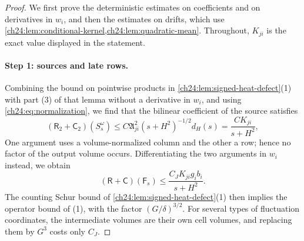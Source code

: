 \begin{proof}
We first prove the deterministic estimates on coefficients and on derivatives in $w_i$, and then the estimates on drifts, which use \cref{ch24:lem:conditional-kernel,ch24:lem:quadratic-mean}. Throughout, $K_{ji}$ is the exact value displayed in the statement.

\paragraph{Step 1: sources and late rows.}
Combining the bound on pointwise products in \cref{ch24:lem:signed-heat-defect}(1) with part (3) of that lemma without a derivative in $w_i$, and using \eqref{ch24:eq:normalization}, we find that the bilinear coefficient of the source satisfies
\begin{equation}\label{ch24:eq:source-coefficients}
 (\mathsf R_2+\mathsf C_2)(S_s^\omega)\le C\mathfrak A_{ji}^2(s+H^2)^{-1/2}d_H(s)=\frac{CK_{ji}}{s+H^2},
\end{equation}
One argument uses a volume-normalized column and the other a row; hence no factor of the output volume occurs. Differentiating the two arguments in $w_i$ instead, we obtain
\begin{equation}\label{ch24:eq:value-source-white}
 (\mathsf R+\mathsf C)(\mathsf F_s)\le\frac{C_JK_{ji}g_ib_i}{s+H^2}.
\end{equation}
The counting Schur bound of \cref{ch24:lem:signed-heat-defect}(1) then implies the operator bound of (1), with the factor $(G/\delta)^{3/2}$. For several types of fluctuation coordinates, the intermediate volumes are their own cell volumes, and replacing them by $G^3$ costs only $C_J$.


\end{proof}
